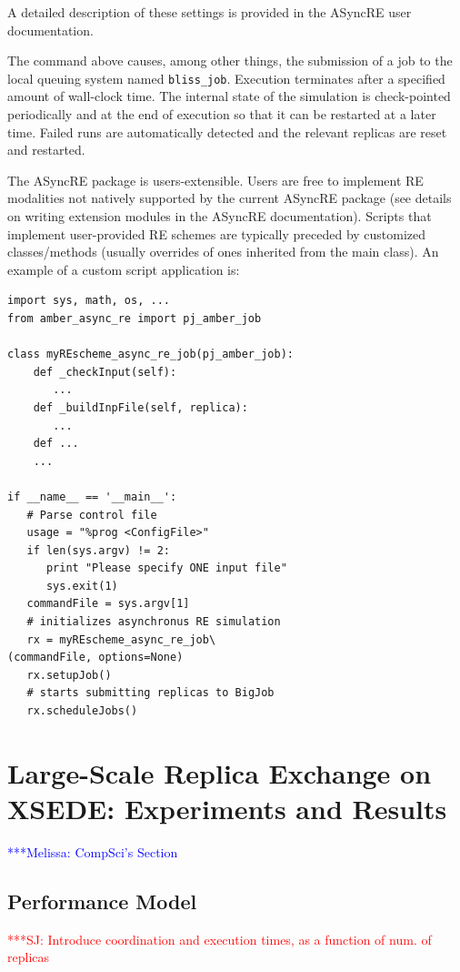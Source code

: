 \documentclass{sig-alternate}
\newcommand{\jhanote}[1]{ {\textcolor{red} { ***SJ: #1 }}}
\newcommand{\mrnote}[1]{ {\textcolor{blue} { ***Melissa: #1 }}}
\newcommand{\jhanote}[1]{}
\begin{document}
A detailed description of these settings is provided in the ASyncRE user documentation.


The command above causes, among other things, the submission of a job
to the local queuing system named \verb+bliss_job+. Execution terminates after a specified amount of
wall-clock time. The internal state of the simulation is check-pointed
periodically and at the end of execution so that it can be restarted
at a later time. Failed runs are automatically detected
and the relevant replicas are reset and restarted.

The ASyncRE package is users-extensible. Users are free to implement
RE modalities not natively supported by the current ASyncRE package
(see details on writing extension modules in the ASyncRE
documentation). Scripts that implement user-provided RE schemes are
typically preceded by customized classes/methods (usually overrides of
ones inherited from the main class). An example of a custom script application is:

\begin{lstlisting}[frame=single]
import sys, math, os, ...
from amber_async_re import pj_amber_job

class myREscheme_async_re_job(pj_amber_job):
    def _checkInput(self):
       ...
    def _buildInpFile(self, replica):
       ...
    def ...
    ...

if __name__ == '__main__':
   # Parse control file
   usage = "%prog <ConfigFile>"
   if len(sys.argv) != 2:
      print "Please specify ONE input file"
      sys.exit(1)    
   commandFile = sys.argv[1]
   # initializes asynchronus RE simulation
   rx = myREscheme_async_re_job\
(commandFile, options=None)
   rx.setupJob()
   # starts submitting replicas to BigJob
   rx.scheduleJobs()
\end{lstlisting}





\section{Large-Scale Replica Exchange on XSEDE: Experiments and
  Results}\label{sec:results}
\mrnote{ CompSci's Section}

\subsection{Performance Model}

\jhanote{Introduce coordination and execution times, as a function of
  num. of replicas}
\end{document}
